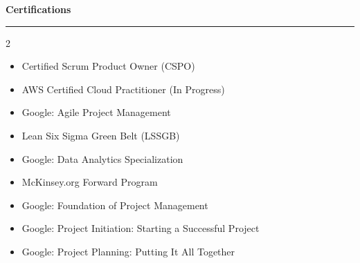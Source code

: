 \documentclass[9pt,letterpaper]{article} %
\newenvironment{rSection}[1]{ %
  \sectionskip
 \textbf{\Large #1} %
  \sectionlineskip
  \hrule %
  \begin{list}{}{ %
    \setlength{\leftmargin}{-0em} %
  }
  \item[]
}{
  \end{list}
}
\def\sectionlineskip{\smallskip} %
\def\sectionskip{} %
\begin{document}
\begin{rSection}{Certifications}
\begin{multicols}{2}
\begin{itemize}[left=-1.5em, labelsep=.1cm, labelwidth=.2cm, itemsep=0.0em, topsep=0pt]
\item Certified Scrum Product Owner (CSPO)
\item AWS Certified Cloud Practitioner (In Progress)
\item Google: Agile Project Management
\item Lean Six Sigma Green Belt (LSSGB)
\item Google: Data Analytics Specialization
\item McKinsey.org Forward Program
\item Google: Foundation of Project Management
\item Google: Project Initiation: Starting a Successful Project
\item Google: Project Planning: Putting It All Together
\end{itemize}
\end{multicols}
\end{rSection}
\end{document}
